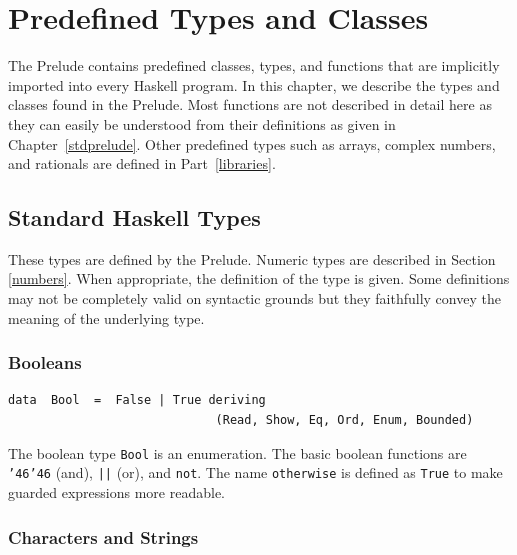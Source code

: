 %
%
\chapter{Predefined Types and Classes}
\label{basic-types-and-classes}
The \Haskell{} Prelude contains predefined classes, types,
and functions that are implicitly imported into every Haskell
program.  In this chapter, we describe the types and classes found in
the Prelude.
Most functions are not described in detail here as they
can easily be understood from their definitions as given in Chapter~\ref{stdprelude}.
Other predefined types such as arrays, complex numbers, and rationals
are defined in Part~\ref{libraries}.

\section{Standard Haskell Types}
\label{basic-types}
These types are defined by the \Haskell{} Prelude.  Numeric types are
described in Section \ref{numbers}.  When appropriate, the \Haskell{}
definition of the type is given.  Some definitions may not be
completely valid on syntactic grounds but they faithfully convey the
meaning of the underlying type.

\subsection{Booleans}
\label{booleans}
\bprog
{\small\begin{verbatim}
data  Bool  =  False | True deriving 
                             (Read, Show, Eq, Ord, Enum, Bounded)
\end{verbatim}}
\eprog
The boolean type \mbox{\tt Bool} is an enumeration. %
The basic boolean functions are \mbox{\tt {\char'46}{\char'46}} (and), \mbox{\tt ||} (or), and \mbox{\tt not}.
The name \mbox{\tt otherwise} is defined as \mbox{\tt True} to make guarded expressions
more readable.

\label{prelude-bool}

\subsection{Characters and Strings}
\label{characters}

